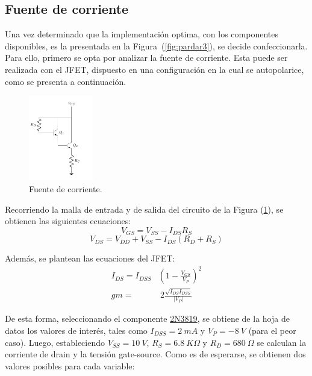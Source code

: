 \subsection{Fuente de corriente}
\label{subsec:fdei}
Una vez determinado que la implementación optima, con los componentes disponibles, es la presentada en la Figura~(\ref{fig:pardar3}), se decide confeccionarla. Para ello, primero se opta por analizar la fuente de corriente. Esta puede ser realizada con el JFET, dispuesto en una configuración en la cual se autopolarice, como se presenta a continuación.
\begin{figure}[H]
\centering
	\includegraphics[width=0.25\textwidth, page=4]{Imagenes/ParDarlington.pdf}
	\caption{Fuente de corriente.}
	\label{fig:fuentei}
\end{figure}

Recorriendo la malla de entrada y de salida del circuito de la Figura (\ref{fig:fuentei}), se obtienen las siguientes ecuaciones:
\begin{equation}
	V_{GS} = V_{SS} - I_{DS} R_{S}
\end{equation}
\begin{equation}
	V_{DS} = V_{DD} + V_{SS} - I_{DS} \left( R_{D} + R_{S} \right)
\end{equation}

Además, se plantean las ecuaciones del JFET:
\begin{equation}
\begin{split}
	I_{DS} = I_{DSS} & \left( 1 - \frac{V_{GS}}{V_P} \right)^2 \\
	gm = & \ 2\frac{\sqrt{I_{DS} I_{DSS}}}{|V_P|}
\end{split}
\end{equation}

De esta forma, seleccionando el componente \href{https://www.onsemi.com/pub/Collateral/2N3819-D.PDF}{2N3819}, se obtiene de la hoja de datos los valores de interés, tales como $I_{DSS} = 2 \ mA$ y $V_P = -8 \ V$ (para el peor caso). Luego, estableciendo $V_{SS} = 10 \ V$, $R_S = 6.8 \ K\Omega$ y $R_D = 680 \ \Omega$ se calculan la corriente de drain y la tensión gate-source. Como es de esperarse, se obtienen dos valores posibles para cada variable:

